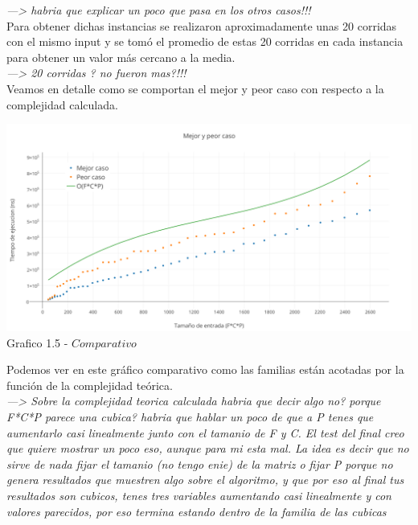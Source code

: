 \textit{---> habria que explicar un poco que pasa en los otros casos!!!}\\

Para obtener dichas instancias se realizaron aproximadamente unas 20 corridas con el mismo input y se tom\'o el promedio de estas 20 corridas en cada instancia para obtener un valor m\'as cercano a la media.\\ 

\textit{---> 20 corridas ? no fueron mas?!!!}\\

Veamos en detalle como se comportan el mejor y peor caso con respecto a la complejidad calculada.\\

  \vspace*{0.3cm} \vspace*{0.3cm}
  \begin{center}
\includegraphics[scale=0.5]{./EJ1/MejorYPeorCaso.png}
{Grafico 1.5 - $Comparativo$}
  \end{center}
  \vspace*{0.3cm}
  
Podemos ver en este gr\'afico comparativo como las familias est\'an acotadas por la funci\'on de la complejidad te\'orica.\\

\textit{---> Sobre la complejidad teorica calculada habria que decir algo no? porque F*C*P parece una cubica? habria que hablar un poco de que a P tenes que aumentarlo casi linealmente junto con el tamanio de F y C. El test del final creo que quiere mostrar un poco eso, aunque para mi esta mal. La idea es decir que no sirve de nada fijar el tamanio (no tengo enie) de la matriz o fijar P porque no genera resultados que muestren algo sobre el algoritmo, y que por eso al final tus resultados son cubicos, tenes tres variables aumentando casi linealmente y con valores parecidos, por eso termina estando dentro de la familia de las cubicas}\\

